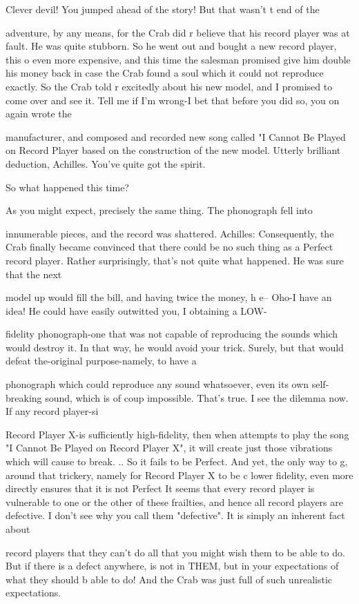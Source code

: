 \tortoise Clever devil! You jumped ahead of the story! But that wasn't t end of the\par
adventure, by any means, for the Crab did r believe that his record player was at fault. He was quite stubborn. So he went out and bought a new record player, this o even more expensive, and this time the salesman promised give him double his money back in case the Crab found a soul which it could not reproduce exactly. So the Crab told r excitedly about his new model, and I promised to come over and see it. 
\achilles Tell me if I'm wrong-I bet that before you did so, you on again wrote the\par
manufacturer, and composed and recorded new song called "I Cannot Be Played on Record Player based on the construction of the new model. 
\tortoise Utterly brilliant deduction, Achilles. You've quite got the spirit.\par

\achilles So what happened this time?\par

\tortoise As you might expect, precisely the same thing. The phonograph fell into\par
innumerable pieces, and the record was shattered. Achilles: Consequently, the Crab finally became convinced that there could be no such thing as a Perfect record player. 
\tortoise Rather surprisingly, that's not quite what happened. He was sure that the next\par
model up would fill the bill, and having twice the money, h e-- 
\achilles Oho-I have an idea! He could have easily outwitted you, I obtaining a LOW-\par
fidelity phonograph-one that was not capable of reproducing the sounds which would destroy it. In that way, he would avoid your trick. 
\tortoise Surely, but that would defeat the-original purpose-namely, to have a\par
phonograph which could reproduce any sound whatsoever, even its own self- breaking sound, which is of coup impossible. 
\achilles That's true. I see the dilemma now. If any record player-si\par
Record Player X-is sufficiently high-fidelity, then when attempts to play the song "I Cannot Be Played on Record Player X", it will create just those vibrations which will cause to break. .. So it fails to be Perfect. And yet, the only way to g, around that trickery, namely for Record Player X to be c lower fidelity, even more directly ensures that it is not Perfect It seems that every record player is vulnerable to one or the other of these frailties, and hence all record players are defective. 
\tortoise I don't see why you call them "defective". It is simply an inherent fact about\par
record players that they can't do all that you might wish them to be able to do. But if there is a defect anywhere, is not in THEM, but in your expectations of what they should b able to do! And the Crab was just full of such unrealistic expectations. 








